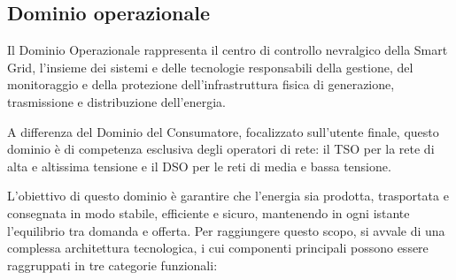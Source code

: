 \subsection{Dominio operazionale}




Il Dominio Operazionale rappresenta il centro di controllo nevralgico della Smart Grid, l'insieme dei sistemi e delle tecnologie responsabili della gestione, del monitoraggio e della protezione dell'infrastruttura fisica di generazione, trasmissione e distribuzione dell'energia.


A differenza del Dominio del Consumatore, focalizzato sull'utente finale, questo dominio è di competenza esclusiva degli operatori di rete: il TSO per la rete di alta e altissima tensione e il DSO per le reti di media e bassa tensione.


L'obiettivo di questo dominio è garantire che l'energia sia prodotta, trasportata e consegnata in modo stabile, efficiente e sicuro, mantenendo in ogni istante l'equilibrio tra domanda e offerta. Per raggiungere questo scopo, si avvale di una complessa architettura tecnologica, i cui componenti principali possono essere raggruppati in tre categorie funzionali:



    
